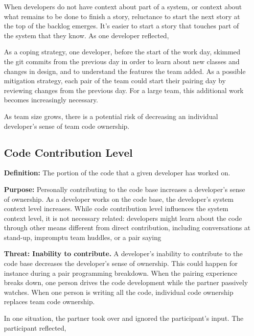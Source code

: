When developers do not have context about part of a system, or context about what remains to be done to finish a story, reluctance to start the next story at the top of the backlog emerges. It’s easier to start a story that touches part of the system that they know. As one developer reflected, 

As a coping strategy, one developer, before the start of the work day, skimmed the git commits from the previous day in order to learn about new classes and changes in design, and to understand the features the team added. As a possible mitigation strategy, each pair of the team could start their pairing day by reviewing changes from the previous day. For a large team, this additional work becomes increasingly necessary. 

As team size grows, there is a potential risk of decreasing an individual developer’s sense of team code ownership. 

\subsection{Code Contribution Level}
\textbf{Definition:} The portion of the code that a given developer has worked on. 

\textbf{Purpose:} Personally contributing to the code base increases a developer’s sense of ownership. As a developer works on the code base, the developer’s system context level increases. While code contribution level influences the system context level, it is not necessary related: developers might learn about the code through other means different from direct contribution, including conversations at stand-up, impromptu team huddles, or a pair saying 

\textbf{Threat: Inability to contribute.}  A developer’s inability to contribute to the code base decreases the developer’s sense of ownership. This could happen for instance during a pair programming breakdown. When the pairing experience breaks down, one person drives the code development while the partner passively watches. When one person is writing all the code, individual code ownership replaces team code ownership.  

In one situation, the partner took over and ignored the participant’s input. The participant reflected,  

